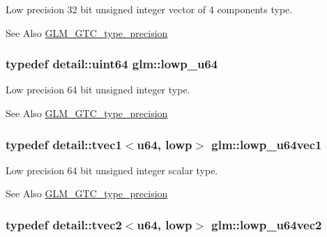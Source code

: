 Low precision 32 bit unsigned integer vector of 4 components type. \begin{DoxySeeAlso}{See Also}
\hyperlink{group__gtc__type__precision}{G\-L\-M\-\_\-\-G\-T\-C\-\_\-type\-\_\-precision} 
\end{DoxySeeAlso}
\hypertarget{group__gtc__type__precision_ga61ed4c68a4cffb77cd63cc107119123a}{
\subsubsection[{lowp\-\_\-u64}]{\setlength{\rightskip}{0pt plus 5cm}typedef detail\-::uint64 {\bf glm\-::lowp\-\_\-u64}}}\label{group__gtc__type__precision_ga61ed4c68a4cffb77cd63cc107119123a}
Low precision 64 bit unsigned integer type. \begin{DoxySeeAlso}{See Also}
\hyperlink{group__gtc__type__precision}{G\-L\-M\-\_\-\-G\-T\-C\-\_\-type\-\_\-precision} 
\end{DoxySeeAlso}
\hypertarget{group__gtc__type__precision_gacd97dc5e92d0e2f6f6d62a5160508e2a}{
\subsubsection[{lowp\-\_\-u64vec1}]{\setlength{\rightskip}{0pt plus 5cm}typedef detail\-::tvec1$<$u64, lowp$>$ {\bf glm\-::lowp\-\_\-u64vec1}}}\label{group__gtc__type__precision_gacd97dc5e92d0e2f6f6d62a5160508e2a}
Low precision 64 bit unsigned integer scalar type. \begin{DoxySeeAlso}{See Also}
\hyperlink{group__gtc__type__precision}{G\-L\-M\-\_\-\-G\-T\-C\-\_\-type\-\_\-precision} 
\end{DoxySeeAlso}
\hypertarget{group__gtc__type__precision_gae0e7d3ed32e8e79b4f6dd0c9baafcaea}{
\subsubsection[{lowp\-\_\-u64vec2}]{\setlength{\rightskip}{0pt plus 5cm}typedef detail\-::tvec2$<$u64, lowp$>$ {\bf glm\-::lowp\-\_\-u64vec2}}}\label{group__gtc__type__precision_gae0e7d3ed32e8e79b4f6dd0c9baafcaea}
